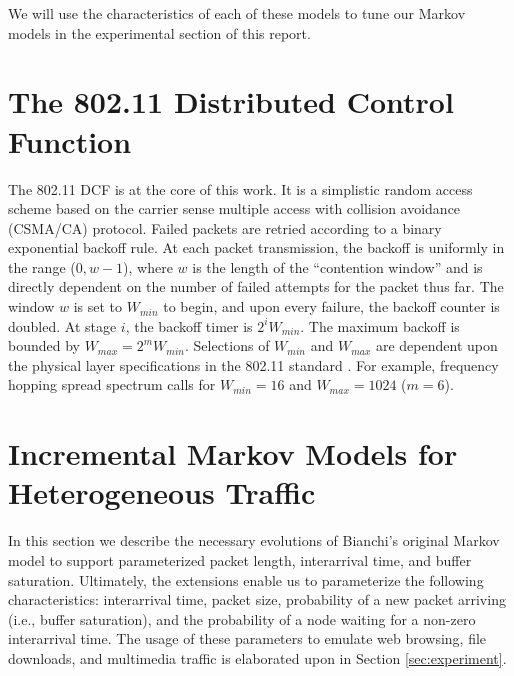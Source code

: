 \documentclass{llncs}
\begin{document}
We will use the characteristics of each of these models to tune our Markov models in the experimental section of this report. 

\section{The 802.11 Distributed Control Function}
The 802.11 DCF \cite{ieee1997wireless} is at the core of this work. It is a simplistic random access scheme based on the carrier sense multiple access with collision avoidance (CSMA/CA) protocol. Failed packets are retried according to a binary exponential backoff rule. At each packet transmission, the backoff is uniformly in the range ($0, w-1$), where $w$ is the length of the ``contention window'' and is directly dependent on the number of failed attempts for the packet thus far. The window $w$ is set to $W_{min}$ to begin, and upon every failure, the backoff counter is doubled. At stage $i$, the backoff timer is $2^iW_{min}$. The maximum backoff is bounded by $W_{max} = 2^mW_{min}$. Selections of $W_{min}$ and $W_{max}$ are dependent upon the physical layer specifications in the 802.11 standard \cite{ieee1997wireless,dcf}. For example, frequency hopping spread spectrum calls for $W_{min} = 16$ and $W_{max} = 1024$ ($m = 6$). 

\section{Incremental Markov Models for Heterogeneous Traffic}
In this section we describe the necessary evolutions of Bianchi's original Markov model to support parameterized packet length, interarrival time, and buffer saturation. Ultimately, the extensions enable us to parameterize the following characteristics: interarrival time, packet size, probability of a new packet arriving (i.e., buffer saturation), and the probability of a node waiting for a non-zero interarrival time. The usage of these parameters to emulate web browsing, file downloads, and multimedia traffic is elaborated upon in Section \ref{sec:experiment}.
\end{document}
